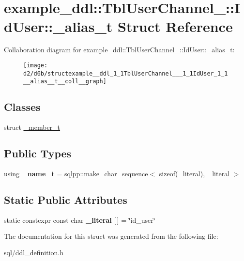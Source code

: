 \hypertarget{structexample__ddl_1_1TblUserChannel___1_1IdUser_1_1__alias__t}{}\section{example\+\_\+ddl\+:\+:Tbl\+User\+Channel\+\_\+\+:\+:Id\+User\+:\+:\+\_\+alias\+\_\+t Struct Reference}
\label{structexample__ddl_1_1TblUserChannel___1_1IdUser_1_1__alias__t}


Collaboration diagram for example\+\_\+ddl\+:\+:Tbl\+User\+Channel\+\_\+\+:\+:Id\+User\+:\+:\+\_\+alias\+\_\+t\+:
\nopagebreak
\begin{figure}[H]
\begin{center}
\leavevmode
\texttt{[image: d2/d6b/structexample\_\_ddl\_1\_1TblUserChannel\_\_\_1\_1IdUser\_1\_1\_\_alias\_\_t\_\_coll\_\_graph]}
\end{center}
\end{figure}
\subsection*{Classes}
\begin{DoxyCompactItemize}
\item 
struct \hyperlink{structexample__ddl_1_1TblUserChannel___1_1IdUser_1_1__alias__t_1_1__member__t}{\+\_\+member\+\_\+t}
\end{DoxyCompactItemize}
\subsection*{Public Types}
\begin{DoxyCompactItemize}
\item 
\hypertarget{structexample__ddl_1_1TblUserChannel___1_1IdUser_1_1__alias__t_a7727e9ee0c24530144b1f80aa66d4be7}{}using {\bfseries \+\_\+name\+\_\+t} = sqlpp\+::make\+\_\+char\+\_\+sequence$<$ sizeof(\+\_\+literal), \+\_\+literal $>$\label{structexample__ddl_1_1TblUserChannel___1_1IdUser_1_1__alias__t_a7727e9ee0c24530144b1f80aa66d4be7}

\end{DoxyCompactItemize}
\subsection*{Static Public Attributes}
\begin{DoxyCompactItemize}
\item 
\hypertarget{structexample__ddl_1_1TblUserChannel___1_1IdUser_1_1__alias__t_a3715db013cbddcada1d0ed3d2d71210a}{}static constexpr const char {\bfseries \+\_\+literal} \mbox{[}$\,$\mbox{]} = \char`\"{}id\+\_\+user\char`\"{}\label{structexample__ddl_1_1TblUserChannel___1_1IdUser_1_1__alias__t_a3715db013cbddcada1d0ed3d2d71210a}

\end{DoxyCompactItemize}


The documentation for this struct was generated from the following file\+:\begin{DoxyCompactItemize}
\item 
sql/ddl\+\_\+definition.\+h\end{DoxyCompactItemize}
